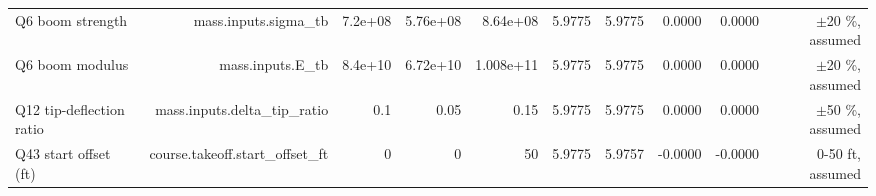 \begin{table}[htbp]
{\begin{tabular}{lrrrrrrrrr}
Q6 boom strength & mass.inputs.sigma\_tb & 7.2e+08 & 5.76e+08 & 8.64e+08 & 5.9775 & 5.9775 & 0.0000 & 0.0000 & $\pm$20 \%, assumed \\
Q6 boom modulus & mass.inputs.E\_tb & 8.4e+10 & 6.72e+10 & 1.008e+11 & 5.9775 & 5.9775 & 0.0000 & 0.0000 & $\pm$20 \%, assumed \\
Q12 tip-deflection ratio & mass.inputs.delta\_tip\_ratio & 0.1 & 0.05 & 0.15 & 5.9775 & 5.9775 & 0.0000 & 0.0000 & $\pm$50 \%, assumed \\
Q43 start offset (ft) & course.takeoff.start\_offset\_ft & 0 & 0 & 50 & 5.9775 & 5.9757 & -0.0000 & -0.0000 & 0-50 ft, assumed \\
\bottomrule
\end{tabular}}
\end{table}
